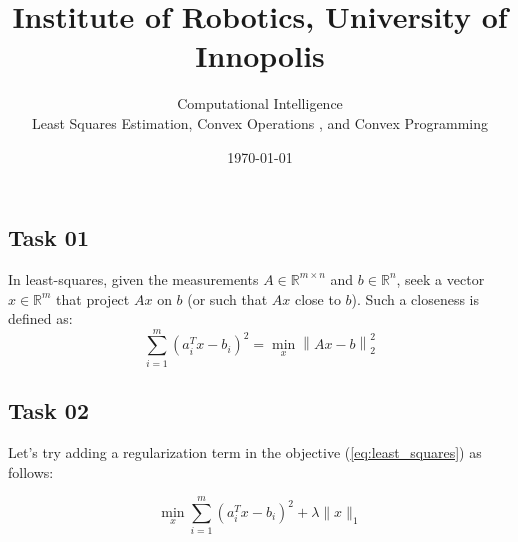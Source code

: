 \documentclass[12pt]{article}%
\begin{document}
\title{Institute of Robotics,  University of Innopolis}
\author{Computational Intelligence \\ Least Squares Estimation, Convex Operations , and Convex Programming}
\date{\today}
\maketitle

\subsection{Task 01}
In least-squares, given the measurements $A \in \mathbb{R}^{m\times n}$ and $b \in \mathbb{R}^{n}$, seek a vector $x \in \mathbb{R}^m$ that project $Ax$ on $b$ (or such that $Ax$ close to $b$). Such a closeness is defined as:
\begin{equation} \label{eq:least_squares}
    \sum_{i=1}^m (a_i^Tx-b_i)^2 = \min_x \left \| Ax -b \right \|_2^2
\end{equation}


\subsection{Task 02}
Let's try adding a regularization term in the objective (\ref{eq:least_squares}) as follows:

\begin{equation}\label{eq:lasso}
    \min_{x} \sum_{i=1}^m (a_i^Tx-b_i)^2+\lambda\|x\|_1
\end{equation}
\end{document}
